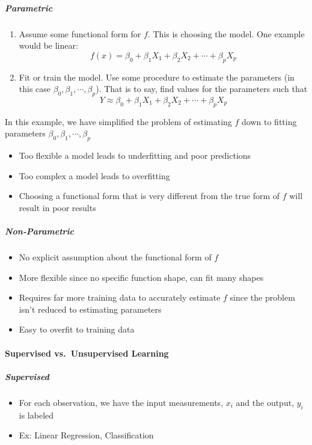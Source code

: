 \subparagraph{Parametric}\label{parametric}

\begin{enumerate}
\def\labelenumi{\arabic{enumi}.}
\tightlist
\item
  Assume some functional form for \(f\). This is choosing the model. One
  example would be linear:
  \[f(x) = \beta_0 + \beta_1 X_1 + \beta_2 X_2 + \cdots + \beta_p X_p\] 
  \item
  Fit or train the model. Use some procedure to estimate the parameters
  (in this case \(\beta_0, \beta_1, \cdots, \beta_p\)). That is to say,
  find values for the parameters such that
  \[Y \approx  \beta_0 + \beta_1 X_1 + \beta_2 X_2 + \cdots + \beta_p X_p\]
\end{enumerate}


In this example, we have simplified the problem of estimating \(f\) down to fitting parameters \(\beta_0, \beta_1, \cdots, \beta_p\)
\begin{itemize}
	\tightlist
	\item Too flexible a model leads to underfitting and poor predictions
	\item Too complex a model leads to overfitting
	\item Choosing a functional form that is very different from the true form of \(f\) will result in poor results
	
\end{itemize}

\subparagraph{Non-Parametric}
\begin{itemize}
	\tightlist
	\item No explicit assumption about the	functional form of \(f\)
	\item More flexible since no specific function shape, can fit many shapes
	\item Requires far more training data to 	accurately estimate \(f\) since the problem isn't reduced to estimating	parameters 
	\item Easy to overfit to training data
\end{itemize}

\paragraph{Supervised vs.~Unsupervised Learning}\label{supervised-vs.-unsupervised-learning}

\subparagraph{Supervised}

\begin{itemize}
\tightlist
\item  For each observation, we have the input measurements, \(x_i\) and the  output, \(y_i\) is labeled
\item  Ex: Linear Regression, Classification
  \end{itemize}
  
